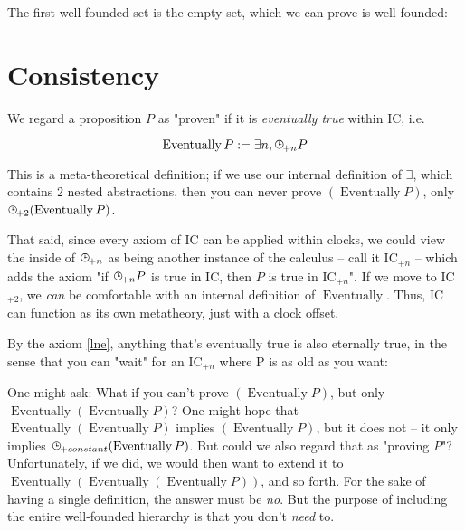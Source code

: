 \documentclass{article}
\begin{document}

  The first well-founded set is the empty set, which we can prove is well-founded:
  
%
%
%
%

  \section{Consistency}\label{consistency}
  
  We regard a proposition $P$ as "proven" if it is \emph{eventually true} within IC, i.e.
  
  \newcommand{\eventually}{\operatorname{\mathrm{Eventually}}}
  
  \[ \eventually P := \exists n, \clocksub{+n} P \]
  
  This is a meta-theoretical definition; if we use our internal definition of $\exists$, which contains 2 nested abstractions, then you can never prove $(\eventually P)$, only $\clocksub{+2}(\eventually P)$.
  
  That said, since every axiom of IC can be applied within clocks, we could view the inside of $\clocksub{+n}$ as being another instance of the calculus – call it IC$_{+n}$ – which adds the axiom "if $\clocksub{+n} P$ is true in IC, then $P$ is true in IC$_{+n}$". If we move to IC$_{+2}$, we \emph{can} be comfortable with an internal definition of $\eventually$. Thus, IC can function as its own metatheory, just with a clock offset.
  
  By the axiom \eqref{lne}, anything that's eventually true is also eternally true, in the sense that you can "wait" for an IC$_{+n}$ where P is as old as you want:
  
  
  One might ask: What if you can't prove $(\eventually P)$, but only $\eventually (\eventually P)$? One might hope that $\eventually (\eventually P)$ implies $(\eventually P)$, but it does not – it only implies $\clocksub{+constant}(\eventually P)$. But could we also regard that as "proving $P$"? Unfortunately, if we did, we would then want to extend it to $\eventually (\eventually (\eventually P))$, and so forth. For the sake of having a single definition, the answer must be \emph{no}. But the purpose of including the entire well-founded hierarchy is that you don't \emph{need} to.
  
\end{document}
